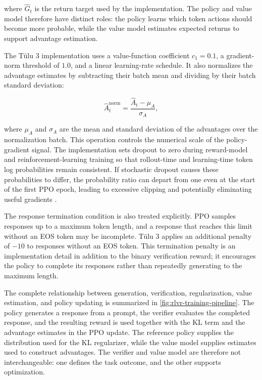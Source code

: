 where \(\widehat{G}_t\) is the return target used by the implementation.
The policy and value model therefore have distinct roles: the policy learns
which token actions should become more probable, while the value model
estimates expected returns to support advantage estimation.

The Tülu 3 implementation uses a value-function coefficient \(c_1=0.1\),
a gradient-norm threshold of \(1.0\), and a linear learning-rate schedule.
It also normalizes the advantage estimates by subtracting their batch mean
and dividing by their batch standard deviation:

\begin{equation}
    \widehat{A}^{\mathrm{norm}}_t
    =
    \frac{
        \widehat{A}_t-\mu_A
    }{
        \sigma_A
    },
    \label{eq:rlvr-advantage-whitening}
\end{equation}

where \(\mu_A\) and \(\sigma_A\) are the mean and standard deviation of the
advantages over the normalization batch. This operation controls the
numerical scale of the policy-gradient signal. The implementation sets
dropout to zero during reward-model and reinforcement-learning training so
that rollout-time and learning-time token log probabilities remain
consistent. If stochastic dropout causes these probabilities to differ,
the probability ratio can depart from one even at the start of the first PPO
epoch, leading to excessive clipping and potentially eliminating useful
gradients \parencite{lambert2025tulu3}.

The response termination condition is also treated explicitly. PPO samples
responses up to a maximum token length, and a response that reaches this
limit without an EOS token may be incomplete. Tülu 3 applies an additional
penalty of \(-10\) to responses without an EOS token. This termination
penalty is an implementation detail in addition to the binary verification
reward; it encourages the policy to complete its responses rather than
repeatedly generating to the maximum length.

The complete relationship between generation, verification, regularization,
value estimation, and policy updating is summarized in
\cref{fig:rlvr-training-pipeline}. The policy generates a response from a
prompt, the verifier evaluates the completed response, and the resulting
reward is used together with the KL term and the advantage estimates in the
PPO update. The reference policy supplies the distribution used for the KL
regularizer, while the value model supplies estimates used to construct
advantages. The verifier and value model are therefore not interchangeable:
one defines the task outcome, and the other supports optimization.

